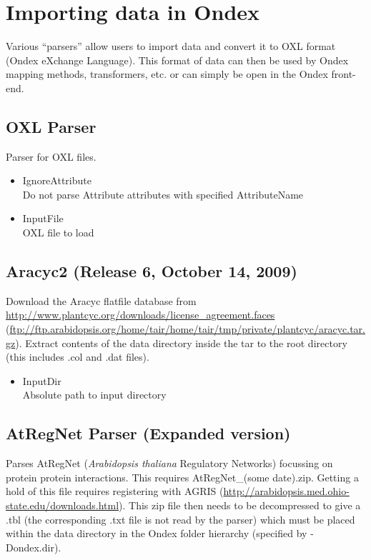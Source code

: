 
\chapter{Importing data in Ondex}
\label{cha:import}
Various ``parsers'' allow users to import data and convert it to OXL format (Ondex eXchange Language).
This format of data can then be used by Ondex mapping methods, transformers, etc.
or can simply be open in the Ondex front-end.


\section{OXL Parser}
Parser for OXL files.

\begin{itemize}
  \item{IgnoreAttribute}\\
  Do not parse Attribute attributes with specified AttributeName
  \item{InputFile}\\
  OXL file to load
\end{itemize}
    
\section{Aracyc2 (Release 6, October 14, 2009)}

Download the Aracyc flatfile database from \url{http://www.plantcyc.org/downloads/license_agreement.faces}
(\url{ftp://ftp.arabidopsis.org/home/tair/home/tair/tmp/private/plantcyc/aracyc.tar.gz}).
Extract contents of the data directory inside the tar to the root directory (this includes .col and .dat files).
\begin{itemize}
  \item{InputDir}\\
  Absolute path to input directory
\end{itemize}
    
\section{AtRegNet Parser (Expanded version)}
Parses AtRegNet ({\it{Arabidopsis thaliana}} Regulatory Networks) focussing on protein protein interactions.
This requires AtRegNet\_(some date).zip. Getting a hold of this file requires registering with AGRIS (\url{http://arabidopsis.med.ohio-state.edu/downloads.html}).
This zip file then needs to be decompressed to give a .tbl (the corresponding .txt file is not read by the parser) 
which must be placed within the data directory in the Ondex folder hierarchy (specified by -Dondex.dir).

